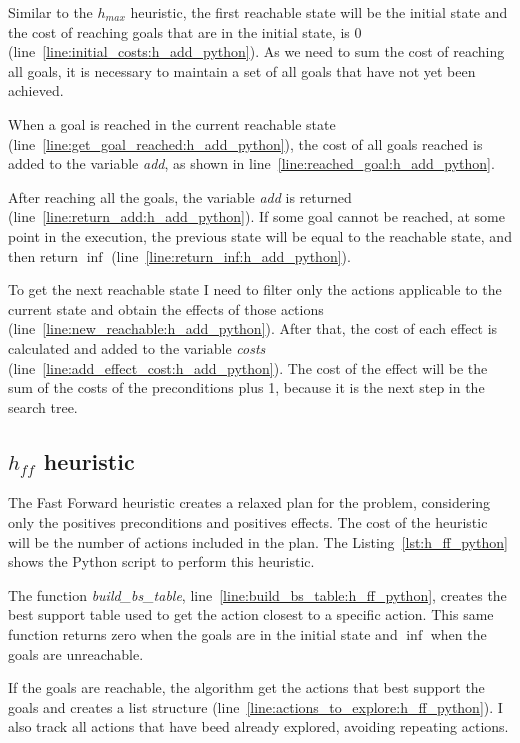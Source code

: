 \documentclass[letterpaper]{article}
\begin{document}
Similar to the $h_{max}$ heuristic, the first reachable state will be the initial state and the cost of reaching goals that are in the initial state, is $0$ (line~\ref{line:initial_costs:h_add_python}). As we need to sum the cost of reaching all goals, it is necessary to maintain a set of all goals that have not yet been achieved.

When a goal is reached in the current reachable state (line~\ref{line:get_goal_reached:h_add_python}), the cost of all goals reached is added to the variable \textit{add}, as shown in line~\ref{line:reached_goal:h_add_python}.

After reaching all the goals, the variable \textit{add} is returned (line~\ref{line:return_add:h_add_python}). If some goal cannot be reached, at some point in the execution, the previous state will be equal to the reachable state, and then return $\inf$ (line~\ref{line:return_inf:h_add_python}).

To get the next reachable state I need to filter only the actions applicable to the current state and obtain the effects of those actions (line~\ref{line:new_reachable:h_add_python}). After that, the cost of each effect is calculated and added to the variable \textit{costs} (line~\ref{line:add_effect_cost:h_add_python}). The cost of the effect will be the sum of the costs of the preconditions plus 1, because it is the next step in the search tree.

\subsection{$h_{ff}$ heuristic}

The Fast Forward heuristic creates a relaxed plan for the problem, considering only the positives preconditions and positives effects. The cost of the heuristic will be the number of actions included in the plan. The Listing~\ref{lst:h_ff_python} shows the Python script to perform this heuristic.



The function \textit{build\_bs\_table}, line~\ref{line:build_bs_table:h_ff_python}, creates the best support table used to get the action closest to a specific action. This same function returns zero when the goals are in the initial state and $\inf$ when the goals are unreachable.

If the goals are reachable, the algorithm get the actions that best support the goals and creates a list structure (line~\ref{line:actions_to_explore:h_ff_python}). I also track all actions that have beed already explored, avoiding repeating actions.
\end{document}
